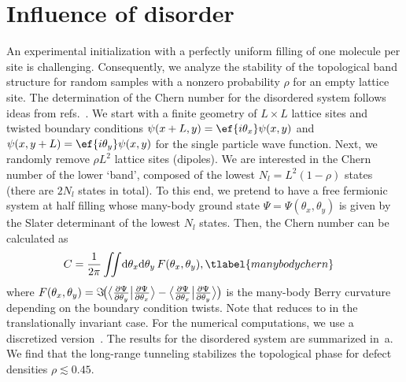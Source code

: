 \section{Influence of disorder}

An experimental initialization with a perfectly uniform filling of one molecule per site is challenging.
Consequently, we analyze the stability of the topological band structure for random samples with a nonzero probability $\rho$ for an empty lattice site.
The determination of the Chern number for the disordered system follows ideas from refs.~\cite{Niu1985,Avron1985}.
We start with a finite geometry of $L \times L$ lattice sites and twisted boundary conditions
$\psi(x + L, y) = \ef{i\theta_x}\psi(x, y)$ and $\psi(x, y + L) = \ef{i\theta_y}\psi(x, y)$ for the single particle wave function.
Next, we randomly remove $\rho L^2$ lattice sites (dipoles).
We are interested in the Chern number of the lower `band', composed of the lowest $N_l=L^2 (1-\rho)$ states (there are $2N_l$ states in total).
To this end, we pretend to have a free fermionic system at half filling whose many-body ground state $\Psi=\Psi(\theta_x, \theta_y)$ is given by the Slater determinant of the lowest $N_l$ states.
Then, the Chern number can be calculated as
\begin{align}
    C &= \frac{1}{2\pi}\iint\!\mathrm{d}\theta_x \mathrm{d}\theta_y \, F(\theta_x, \theta_y), \tlabel{manybodychern}
\end{align}
where $F(\theta_x,\theta_y)=\smash{\Im\!\big({\big\langle\frac{\partial \Psi}{\partial \theta_y}\big|\frac{\partial \Psi}{\partial \theta_x}\big\rangle - \big\langle\frac{\partial \Psi}{\partial \theta_x}\big|\frac{\partial \Psi}{\partial \theta_y}\big\rangle}\big)}$ is the many-body Berry curvature depending on the boundary condition twists.
Note that  reduces to  in the translationally invariant case.
For the numerical computations, we use a discretized version~\cite{Fukui2005}.
The results for the disordered system are summarized in~a.
We find that the long-range tunneling stabilizes the topological phase for defect densities $\rho\lesssim 0.45$.

